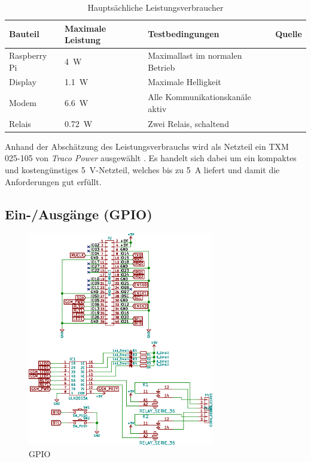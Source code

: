 \begin{table}[h!tb]
    \caption{Haupts\"achliche Leistungsverbraucher}
    \label{tab:hw:master:supply:consumption}
    \small
    \begin{tabular}{llll}
        \toprule
        \textbf{Bauteil} & \textbf{Maximale Leistung} & \textbf{Testbedingungen} & \textbf{Quelle} \\
        \midrule
        Raspberry Pi & \SI{4}{W}    & Maximallast im normalen Betrieb  & \cite{ref:raspipower} \\
        Display      & \SI{1.1}{W}  & Maximale Helligkeit              & \cite{datasheet:display} \\
        Modem        & \SI{6.6}{W}  & Alle Kommunikationskan\"ale aktiv  & \cite{ref:modemrefdesign} \\
        Relais       & \SI{0.72}{W} & Zwei Relais, schaltend           & \cite{datasheet:finder36relais} \\
        \bottomrule
    \end{tabular}
\end{table}

Anhand  der  Absch\"atzung  des  Leistungsverbrauchs  wird  als  Netzteil  ein
TXM  025-105  von   \emph{Traco  Power}  ausgew\"ahlt  \cite{ref:farnell:psu}.
Es   handelt    sich   dabei   um   ein    kompaktes   und   kosteng\"unstiges
\SI{5}{\volt}-Netzteil, welches  bis zu \SI{5}{\ampere} liefert  und damit die
Anforderungen gut erf\"ullt.


\subsection{Ein-/Ausg\"ange (GPIO)}
\label{subsec:hw:master:gpio}

\begin{figure}[h!t]
    \centering
    \includegraphics[width=0.725\textwidth]{images/superv-sch/supervisor--sch--gpio.eps}
    \caption[\Master: Schema GPIO]{GPIO \Master}
    \label{fig:sch:master:gpio}
\end{figure}

